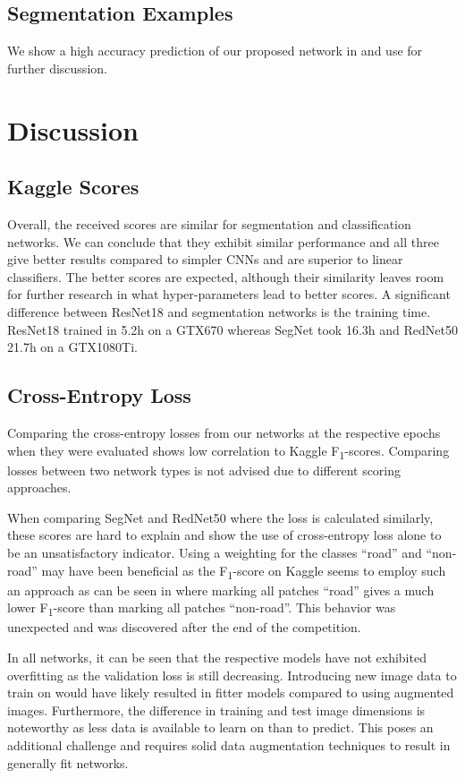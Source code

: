\documentclass[10pt,conference,compsocconf]{IEEEtran}
\begin{document}
\subsection{Segmentation Examples}
\label{subsec:segmentation-examples}
We show a high accuracy prediction of our proposed network in  and use  for further discussion.


\section{Discussion}
\label{sec:discussion}
\subsection{Kaggle Scores}
Overall, the received scores are similar for segmentation and classification networks. We can conclude that they exhibit similar performance and all three give better results compared to simpler CNNs and are superior to linear classifiers. The better scores are expected, although their similarity leaves room for further research in what hyper-parameters lead to better scores. A significant difference between ResNet18 and segmentation networks is the training time. ResNet18 trained in 5.2h on a GTX670 whereas SegNet took 16.3h and RedNet50 21.7h on a GTX1080Ti.

\subsection{Cross-Entropy Loss}
Comparing the cross-entropy losses from our networks at the respective epochs when they were evaluated shows low correlation to Kaggle F\textsubscript{1}-scores. Comparing losses between two network types is not advised due to different scoring approaches.

When comparing SegNet and RedNet50 where the loss is calculated similarly, these scores are hard to explain and show the use of cross-entropy loss alone to be an unsatisfactory indicator. Using a weighting for the classes ``road'' and ``non-road'' may have been beneficial as the F\textsubscript{1}-score on Kaggle seems to employ such an approach as can be seen in  where marking all patches ``road'' gives a much lower F\textsubscript{1}-score than marking all patches ``non-road''. This behavior was unexpected and was discovered after the end of the competition.

In all networks, it can be seen that the respective models have not exhibited overfitting as the validation loss is still decreasing. Introducing new image data to train on would have likely resulted in fitter models compared to using augmented images. Furthermore, the difference in training and test image dimensions is noteworthy as less data is available to learn on than to predict. This poses an additional challenge and requires solid data augmentation techniques to result in generally fit networks.
\end{document}
